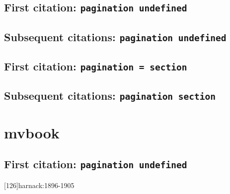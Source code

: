 \documentclass[a4paper]{article}
\begin{document}
\cite[note]{BDAG:a}

\subsection{First citation: \texttt{pagination undefined}}

\cite{BDF}

\citereset
\cite[\S4]{BDF}

\citereset
\cite[note]{BDF}

\subsection{Subsequent citations: \texttt{pagination undefined}}

\cite{BDF}

\cite[\S4]{BDF}

\cite[note]{BDF}

\subsection{First citation: \texttt{pagination = section}}

\cite{BDF:a}

\citereset
\cite[4]{BDF:a}

\citereset
\cite[note]{BDF:a}

\subsection{Subsequent citations: \texttt{pagination section}}

\cite{BDF:a}

\cite[4]{BDF:a}

\cite[note]{BDF:a}

\section{mvbook}

\subsection{First citation: \texttt{pagination undefined}}

\cite{harnack:1896-1905}

\citereset
\cite[2:126]{harnack:1896-1905}

\citereset
\cite[126]{harnack:1896-1905}

\citereset
{}[126]{harnack:1896-1905}
\end{document}
